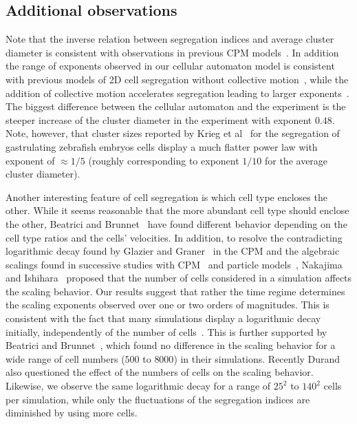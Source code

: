 \documentclass[10pt,letterpaper]{article}
\begin{document}
\subsection*{Additional observations}

Note that the inverse relation between segregation indices and average
cluster diameter is consistent with observations in previous CPM
models~\cite{NakIsh2011,Dur2021}. In addition the range of exponents observed
in our cellular automaton model is consistent with previous models of 2D cell
segregation without collective
motion~\cite{NakIsh2011,BeaBru2011,BeaAlmBru2017,Kra2020,Dur2021},
while the addition of collective motion accelerates segregation
leading to larger exponents~\cite{BelThoBruAlmCha2008,BeaAlmBru2017}.
The biggest difference between the cellular automaton and the
experiment is the steeper increase of the cluster diameter in the experiment with
exponent $0.48$. Note, however, that cluster sizes reported by Krieg et
al~\cite{KriEtal2008} for the segregation of gastrulating zebrafish
embryos cells display a much flatter power law with exponent of
$\approx 1/5$ (roughly corresponding to exponent $1/10$ for the
average cluster diameter).

Another interesting feature of cell segregation is which cell type
encloses the other. While it seems reasonable that the more abundant
cell type should enclose the other, Beatrici and
Brunnet~\cite{BeaBru2011} have found different behavior depending on
the cell type ratios and the cells' velocities. In addition, to
resolve the contradicting logarithmic decay found by Glazier and
Graner~\cite{GlaGra1993} in the CPM and the algebraic scalings found
in successive studies with CPM~\cite{NakIsh2011} and particle
models~\cite{BelThoBruAlmCha2008,BeaBru2011}, Nakajima and
Ishihara~\cite{NakIsh2011} proposed that the number of cells
considered in a simulation affects the scaling behavior.
Our results suggest that rather the time regime determines the
scaling exponents observed over one or two orders of magnitudes.
This is consistent with the fact that many simulations display a logarithmic
decay initially, independently of the number of
cells~\cite{BeaBru2011, BelThoBruAlmCha2008, CocLocSteCol2017, NakIsh2011}.
This is further supported by Beatrici and
Brunnet~\cite{BeaBru2011}, which found no difference in the scaling
behavior for a wide range of cell numbers ($500$ to $8000$) in their
simulations. Recently Durand~\cite{Dur2021} also questioned the effect
of the numbers of cells on the scaling behavior. Likewise, we observe the same
logarithmic decay for a range of $25^2$ to $140^2$ cells per simulation, while
only the fluctuations of the segregation indices are diminished by using more
cells.
\end{document}
